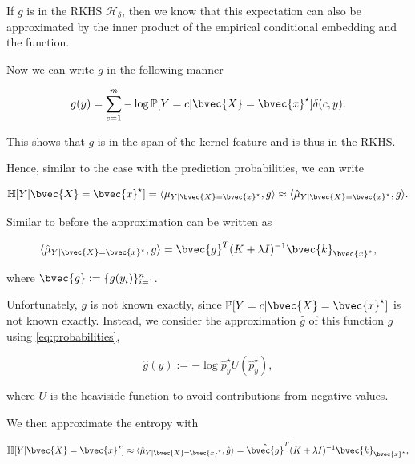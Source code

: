 \documentclass[a4paper, 12pt]{article}
\begin{document}
		If $g$ is in the RKHS $\mathcal{H}_{\delta}$, then we know that this expectation can also be approximated by the inner product of the empirical conditional embedding and the function.
		
		Now we can write $g$ in the following manner
		
		\begin{equation}
			g(y) = \sum_{c = 1}^{m} - \log{\mathbb{P}[Y = c | \bvec{X} = \bvec{x}^{\star}]} \delta(c, y).
		\end{equation}
		
		This shows that $g$ is in the span of the kernel feature and is thus in the RKHS.
		
		Hence, similar to the case with the prediction probabilities, we can write
		
		\begin{equation}
			\mathbb{H}[Y | \bvec{X} = \bvec{x}^{\star}] = \langle \mu_{Y | \bvec{X} = \bvec{x}^{\star}}, g \rangle \approx \langle \hat{\mu}_{Y | \bvec{X} = \bvec{x}^{\star}}, g \rangle.
		\end{equation}
		
		Similar to before the approximation can be written as
		
		\begin{equation}
			\langle \hat{\mu}_{Y | \bvec{X} = \bvec{x}^{\star}}, g \rangle = \bvec{g}^{T} (K + \lambda I)^{-1} \bvec{k}_{\bvec{x}^{\star}},
		\end{equation}
		
		where $\bvec{g} := \{g(y_{i})\}_{i = 1}^{n}$.
		
		Unfortunately, $g$ is not known exactly, since $\mathbb{P}[Y = c | \bvec{X} = \bvec{x}^{\star}]$ is not known exactly. Instead, we consider the approximation $\hat{g}$ of this function $g$ using \eqref{eq:probabilities},
		
		\begin{equation}
			\hat{g}(y) := - \log{\hat{p}^{\star}_{y}} U(\hat{p}^{\star}_{y}),
		\end{equation}
		
		where $U$ is the heaviside function to avoid contributions from negative values.

		We then approximate the entropy with 
		
		\begin{equation}
			\mathbb{H}[Y | \bvec{X} = \bvec{x}^{\star}] \approx \langle \hat{\mu}_{Y | \bvec{X} = \bvec{x}^{\star}}, \hat{g} \rangle = \hat{\bvec{g}}^{T} (K + \lambda I)^{-1} \bvec{k}_{\bvec{x}^{\star}},
		\end{equation}
		
\end{document}

